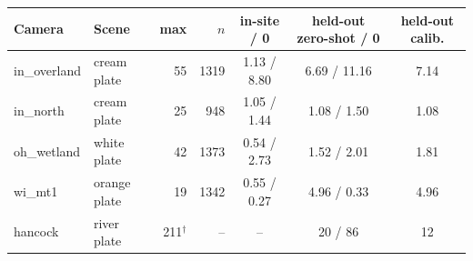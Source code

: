 \begin{tabular}{@{}llrrccc@{}}
\toprule
Camera & Scene & max & $n$ & in-site / 0 & held-out zero-shot / 0 & held-out calib. \\
\midrule
in\_overland & cream plate & 55 & 1319 & 1.13 / 8.80 & 6.69 / 11.16 & 7.14 \\
in\_north & cream plate & 25 & 948 & 1.05 / 1.44 & 1.08 / 1.50 & 1.08 \\
oh\_wetland & white plate & 42 & 1373 & 0.54 / 2.73 & 1.52 / 2.01 & 1.81 \\
wi\_mt1 & orange plate & 19 & 1342 & 0.55 / 0.27 & 4.96 / 0.33 & 4.96 \\
hancock & river plate & 211$^{\dagger}$ & -- & -- & 20 / 86 & 12 \\
\bottomrule
\end{tabular}

